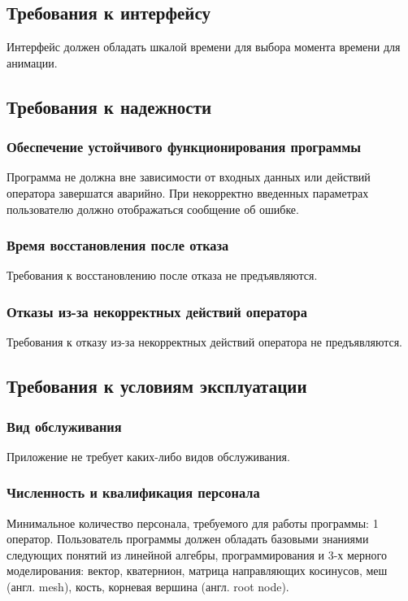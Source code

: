 \subsection{Требования к интерфейсу}
Интерфейс должен обладать шкалой времени для выбора момента времени для анимации.

\subsection{Требования к надежности}
\subsubsection{Обеспечение устойчивого функционирования программы}
Программа не должна вне зависимости от входных данных или действий оператора завершатся аварийно. При некорректно введенных параметрах пользователю должно отображаться сообщение об ошибке.
\subsubsection{Время восстановления после отказа}
Требования к восстановлению после отказа не предъявляются.
\subsubsection{Отказы из-за некорректных действий оператора}
Требования к отказу из-за некорректных действий оператора не предъявляются.

\subsection{Требования к условиям эксплуатации}
\subsubsection{Вид обслуживания}
Приложение не требует каких-либо видов обслуживания.
\subsubsection{Численность и квалификация персонала}
Минимальное количество персонала, требуемого для работы программы: 1 оператор. Пользователь программы должен обладать базовыми знаниями следующих понятий из линейной алгебры, программирования и 3-х мерного моделирования: вектор, кватернион, матрица направляющих косинусов, меш (англ. mesh), кость, корневая вершина (англ. root node).


